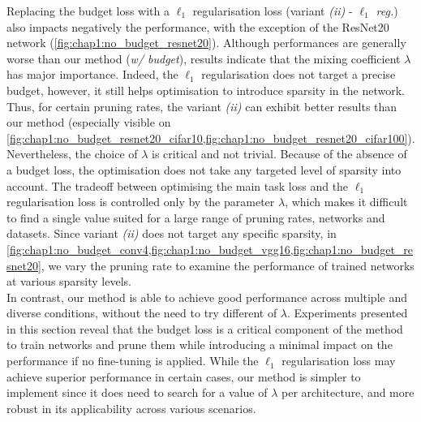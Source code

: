 Replacing the budget loss with a $\ell_1$ regularisation loss (variant
\emph{(ii)} - \emph{$\ell_1$ reg.}) also impacts negatively the performance,
with the exception of the ResNet20 network
(\cref{fig:chap1:no_budget_resnet20}). Although performances are generally worse
than our method (\emph{w/ budget}), results indicate that the mixing coefficient
$\lambda$ has major importance. Indeed, the $\ell_1$ regularisation does not
target a precise budget, however, it still helps optimisation to introduce
sparsity in the network. Thus, for certain pruning rates, the variant
\emph{(ii)} can exhibit better results than our method (especially visible on
\cref{fig:chap1:no_budget_resnet20_cifar10,fig:chap1:no_budget_resnet20_cifar100}).
Nevertheless, the choice of $\lambda$ is critical and not trivial. Because of
the absence of a budget loss, the optimisation does not take any targeted level
of sparsity into account. The tradeoff between optimising the main task loss and
the $\ell_1$ regularisation loss is controlled only by the parameter $\lambda$,
which makes it difficult to find a single value suited for a large range of
pruning rates, networks and datasets. Since variant \emph{(ii)} does not target
any specific sparsity, in
\cref{fig:chap1:no_budget_conv4,fig:chap1:no_budget_vgg16,fig:chap1:no_budget_resnet20},
we vary the pruning rate to examine the performance of trained networks at
various sparsity levels.\\

In contrast, our method is able to achieve good performance across multiple and
diverse conditions, without the need to try different \DIFdelbegin {}\DIFdelend \DIFaddbegin {}\DIFaddend of $\lambda$.
Experiments presented in this section reveal that the budget loss is a critical
component of the method to train networks and prune them while introducing a
minimal impact on the performance if no fine-tuning is applied. While the
$\ell_1$ regularisation loss may achieve superior performance in certain cases,
our method is simpler to implement since it does need to search for a value of
$\lambda$ per architecture, and more robust in its applicability across various
scenarios.\\

